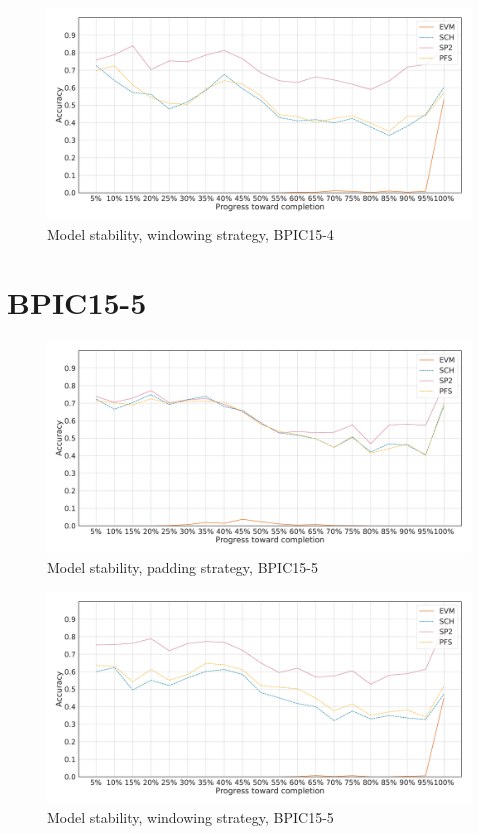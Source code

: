 \begin{figure}[!htb]
    \centering
    \includegraphics[width=\textwidth]{gfx/bpic2015_4/windowed_stability.pdf}
    \caption{Model stability, windowing strategy, BPIC15-4}
    \label{fig:bpic15-4-windowed-stability}
\end{figure}

\FloatBarrier
\section*{BPIC15-5}\label{appendix:stability:2015-5}
\begin{figure}[!htb]
    \centering
    \includegraphics[width=\textwidth]{gfx/bpic2015_5/padded_stability.pdf}
    \caption{Model stability, padding strategy, BPIC15-5}
    \label{fig:bpic15-5-padded-stability}
\end{figure}
\begin{figure}[!htb]
    \centering
    \includegraphics[width=\textwidth]{gfx/bpic2015_5/windowed_stability.pdf}
    \caption{Model stability, windowing strategy, BPIC15-5}
    \label{fig:bpic15-5-windowed-stability}
\end{figure}
